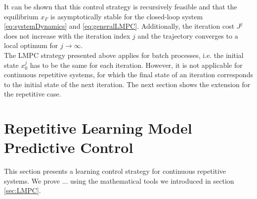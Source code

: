It can be shown that this control strategy is recursively feasible and that the equilibrium $x_F$ is asymptotically stable for the closed-loop  system \eqref{eq:systemDynamics} and \eqref{eq:generalLMPC}. Additionally, the iteration cost $J^j$ does not increase with the iteration index $j$ and the trajectory converges to a local optimum for $j\rightarrow\infty$.\\
The LMPC strategy presented above applies for batch processes, i.e. the initial state $x_0^j$ has to be the same for each iteration. However, it is not applicable for continuous repetitive systems, for which the final state of an iteration corresponds to the initial state of the next iteration. The next section shows the extension for the repetitive case.

\section{Repetitive Learning Model Predictive Control}
This section presents a learning control strategy for continuous repetitive systems. We prove ... using the mathematical tools we introduced in section \ref{sec:LMPC}.\\

